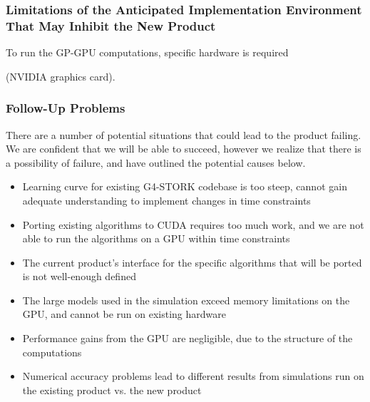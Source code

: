 \documentclass[12pt]{article}
\newcommand{\todo}[1]{\textcolor{red}{[TODO: #1]}} \else
\newcommand{\authornote}[3]{} \newcommand{\todo}[1]{} \fi
\newcommand{\ds}[1]{\authornote{blue}{DS}{#1}} %
\newcommand{\mmp}[1]{\authornote{green}{MP}{#1}}
\newcommand{\vr}[1]{\authornote{green}{VR}{#1}}
\begin{document}
\subsubsection{Limitations of the Anticipated Implementation Environment That May Inhibit the New Product}
To run the GP-GPU computations, specific hardware is required
\ds{You should stop here, unless you explained (in the constraints section)
why you need an NVIDIA card. Also, what is ``recent"?}\mmp{I explained why we need an NVIDIA card. did not explain recent. TODO}\vr{Expanded on ``recent'' in the constraints section}
(NVIDIA graphics card).

\subsubsection{Follow-Up Problems}
There are a number of potential situations that could lead to the product failing. We are confident that we will be able to succeed, however we realize that there is a possibility of failure, and have outlined the potential causes below.
\begin{itemize}
\item Learning curve for existing G4-STORK codebase is too steep, cannot gain adequate understanding to implement changes in time constraints
\item Porting existing algorithms to CUDA requires too much work, and we are not able to run the algorithms on a GPU within time constraints
\item The current product's interface for the specific algorithms that will be ported is not well-enough defined
\item The large models used in the simulation exceed memory limitations on the GPU, and cannot be run on existing hardware
\item Performance gains from the GPU are negligible, due to the structure of the computations
\item Numerical accuracy problems lead to different results from simulations run on the existing product vs. the new product
\end{itemize}

\end{document}
